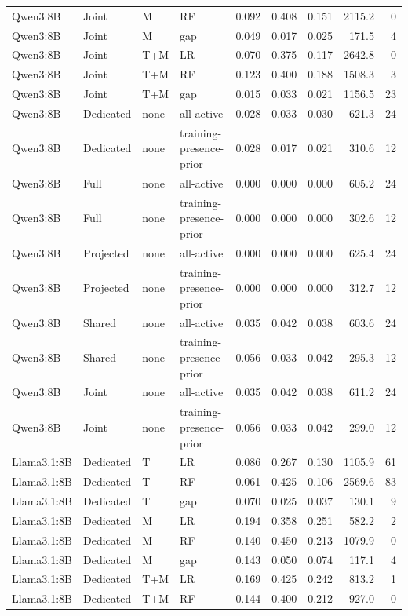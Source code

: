 \begin{longtable}{@{}P{.14\textwidth}P{.13\textwidth}P{.05\textwidth}P{.21\textwidth}rrrrr@{}}
Qwen3:8B & Joint & M & RF & 0.092 & 0.408 & 0.151 & 2115.2 & 0 \\
Qwen3:8B & Joint & M & gap & 0.049 & 0.017 & 0.025 & 171.5 & 4 \\
Qwen3:8B & Joint & T+M & LR & 0.070 & 0.375 & 0.117 & 2642.8 & 0 \\
Qwen3:8B & Joint & T+M & RF & 0.123 & 0.400 & 0.188 & 1508.3 & 3 \\
Qwen3:8B & Joint & T+M & gap & 0.015 & 0.033 & 0.021 & 1156.5 & 23 \\
Qwen3:8B & Dedicated & none & all-active & 0.028 & 0.033 & 0.030 & 621.3 & 24 \\
Qwen3:8B & Dedicated & none & training-presence-prior & 0.028 & 0.017 & 0.021 & 310.6 & 12 \\
Qwen3:8B & Full & none & all-active & 0.000 & 0.000 & 0.000 & 605.2 & 24 \\
Qwen3:8B & Full & none & training-presence-prior & 0.000 & 0.000 & 0.000 & 302.6 & 12 \\
Qwen3:8B & Projected & none & all-active & 0.000 & 0.000 & 0.000 & 625.4 & 24 \\
Qwen3:8B & Projected & none & training-presence-prior & 0.000 & 0.000 & 0.000 & 312.7 & 12 \\
Qwen3:8B & Shared & none & all-active & 0.035 & 0.042 & 0.038 & 603.6 & 24 \\
Qwen3:8B & Shared & none & training-presence-prior & 0.056 & 0.033 & 0.042 & 295.3 & 12 \\
Qwen3:8B & Joint & none & all-active & 0.035 & 0.042 & 0.038 & 611.2 & 24 \\
Qwen3:8B & Joint & none & training-presence-prior & 0.056 & 0.033 & 0.042 & 299.0 & 12 \\
\pagebreak
Llama3.1:8B & Dedicated & T & LR & 0.086 & 0.267 & 0.130 & 1105.9 & 61 \\
Llama3.1:8B & Dedicated & T & RF & 0.061 & 0.425 & 0.106 & 2569.6 & 83 \\
Llama3.1:8B & Dedicated & T & gap & 0.070 & 0.025 & 0.037 & 130.1 & 9 \\
Llama3.1:8B & Dedicated & M & LR & 0.194 & 0.358 & 0.251 & 582.2 & 2 \\
Llama3.1:8B & Dedicated & M & RF & 0.140 & 0.450 & 0.213 & 1079.9 & 0 \\
Llama3.1:8B & Dedicated & M & gap & 0.143 & 0.050 & 0.074 & 117.1 & 4 \\
Llama3.1:8B & Dedicated & T+M & LR & 0.169 & 0.425 & 0.242 & 813.2 & 1 \\
Llama3.1:8B & Dedicated & T+M & RF & 0.144 & 0.400 & 0.212 & 927.0 & 0 \\

\end{longtable}
